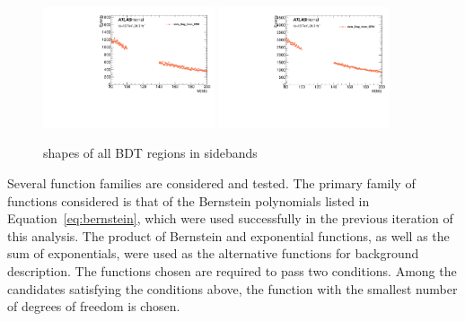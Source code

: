 \begin{figure}[htbp]
 \includegraphics[width=0.45\textwidth]{figures/VBF/Mbb_SRIII_4cen.pdf}
 \includegraphics[width=0.45\textwidth]{figures/VBF/Mbb_SRIV_4cen.pdf}\\
\caption{\Mbb{} shapes of all BDT regions in sidebands} 
  \label{fig:vbf-mbb_sidebands}
\end{figure}


Several function families are considered and tested. The primary family of functions considered is that of the Bernstein polynomials listed in Equation~\ref{eq:bernstein}, which were
used successfully in the previous iteration of this analysis. The product of Bernstein and exponential functions, as well as the sum of exponentials, were used as the alternative functions for background description.
The functions chosen are required to pass two conditions. Among the candidates satisfying the conditions above, the function with the smallest number of degrees of freedom is chosen.

